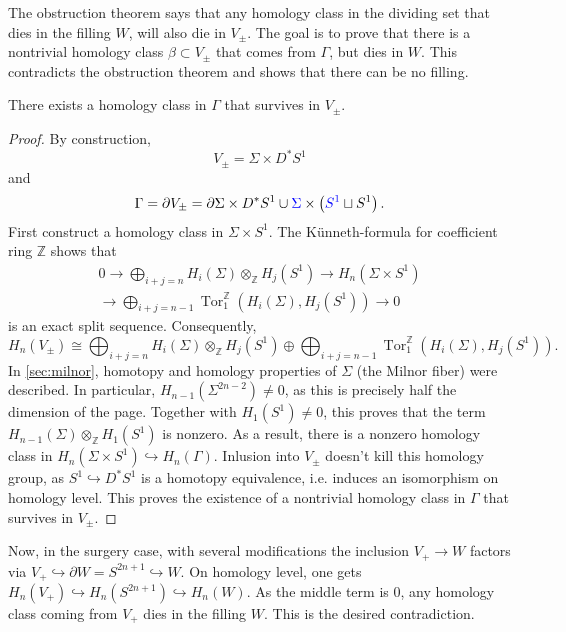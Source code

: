 The obstruction theorem says that any homology class in the dividing set that dies in the filling $W$, will also
die in $V_{\pm}$.
The goal is to prove that there is a nontrivial homology class $\beta \subset V_\pm$ that
comes from $\Gamma$, but dies in $W$. This contradicts the obstruction theorem and shows that there can be no filling.

\begin{lemma}
    There exists a homology class in $\Gamma$ that survives in $V_\pm$.
\end{lemma}
\begin{proof}
    By construction,
    \[
        V_\pm = \Sigma \times D^*S^1
    \]
    and
    \[
        \Gamma = \partial V_\pm = \partial \Sigma \times D^*S^1 \cup \textcolor{blue}{\Sigma} \times \left(\textcolor{blue}{S^1} \sqcup S^1\right).
    \]
    First construct a homology class in $\Sigma \times S^1$.
    The Künneth-formula for coefficient ring $\mathbb Z$ shows that
    \begin{multline}
        0 \to \bigoplus_{i+j = n} H_i(\Sigma) \otimes_{\mathbb Z} H_j(S^1) \to  H_n(\Sigma \times S^1)\\
        \to \bigoplus_{i+j = n-1} \operatorname{Tor}^\mathbb{Z}_1\left(H_i(\Sigma), H_j(S^1)\right) \to 0
    \end{multline}
    is an exact split sequence.
    Consequently,
    \[
        H_n(V_\pm) \cong \bigoplus_{i+j = n} H_i(\Sigma) \otimes_{\mathbb Z} H_j(S^1) \oplus 
        \bigoplus_{i+j = n-1} \operatorname{Tor}^\mathbb{Z}_1\left(H_i(\Sigma), H_j(S^1)\right).
    \]
    In \cref{sec:milnor}, homotopy and homology properties of $\Sigma$ (the Milnor fiber) were described.
    In particular, $H_{n-1}(\Sigma^{2n-2}) \neq 0$, as this is precisely half the dimension of the page.
    Together with $H_1(S^1) \neq 0$, this proves that the term $H_{n-1}(\Sigma) \otimes_{\mathbb Z} H_1(S^1)$ is nonzero. As a result, 
    there is a nonzero homology class in $H_n(\Sigma \times S^1) \hookrightarrow H_n(\Gamma)$.
    Inlusion into $V_\pm$ doesn't kill this homology group, as $S^1 \hookrightarrow D^*S^1$ is a homotopy equivalence,
    i.e. induces an isomorphism on homology level. 
    This proves the existence of a nontrivial homology class in $\Gamma$ that survives in $V_\pm$.
\end{proof}

Now, in the surgery case, with several modifications the inclusion
$V_+ \to W$ factors via $V_+ \hookrightarrow \partial W = S^{2n+1} \hookrightarrow W$.
On homology level, one gets
$H_n(V_+) \hookrightarrow H_n(S^{2n+1}) \hookrightarrow H_n(W)$.
As the middle term is $0$, any homology class coming from $V_+$ dies in the filling $W$.
This is the desired contradiction.